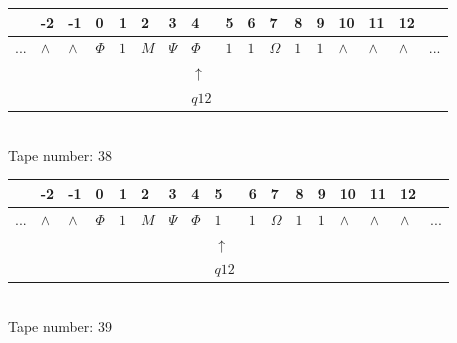 \documentclass[11pt]{article}
\begin{document}
\begin{table}[H]
\centering
\begin{tabular}{lllllllllllllllll}
 & -2 & -1 & 0 & 1 & 2 & 3 & 4 & 5 & 6 & 7 & 8 & 9 & 10 & 11 & 12 & \\
\hline
$...$ & \multicolumn{1}{|l|}{$\wedge$} & \multicolumn{1}{|l|}{$\wedge$} & \multicolumn{1}{|l|}{$\Phi$} & \multicolumn{1}{|l|}{$1$} & \multicolumn{1}{|l|}{$M$} & \multicolumn{1}{|l|}{$\Psi$} & \multicolumn{1}{|l|}{$\Phi$} & \multicolumn{1}{|l|}{$1$} & \multicolumn{1}{|l|}{$1$} & \multicolumn{1}{|l|}{$\Omega$} & \multicolumn{1}{|l|}{$1$} & \multicolumn{1}{|l|}{$1$} & \multicolumn{1}{|l|}{$\wedge$} & \multicolumn{1}{|l|}{$\wedge$} & \multicolumn{1}{|l|}{$\wedge$} & $...$\\
\hline
&  &  &  &  &  &  & $\uparrow$ &  &  &  &  &  &  &  &  &  \\
&  &  &  &  &  &  & $ q12 $ &  &  &  &  &  &  &  &  &  \\
\end{tabular}
\\
Tape number: 38
\noindent\makebox[\linewidth]{\hdashrule{\textwidth}{1pt}{1pt}}\end{table}

\begin{table}[H]
\centering
\begin{tabular}{lllllllllllllllll}
 & -2 & -1 & 0 & 1 & 2 & 3 & 4 & 5 & 6 & 7 & 8 & 9 & 10 & 11 & 12 & \\
\hline
$...$ & \multicolumn{1}{|l|}{$\wedge$} & \multicolumn{1}{|l|}{$\wedge$} & \multicolumn{1}{|l|}{$\Phi$} & \multicolumn{1}{|l|}{$1$} & \multicolumn{1}{|l|}{$M$} & \multicolumn{1}{|l|}{$\Psi$} & \multicolumn{1}{|l|}{$\Phi$} & \multicolumn{1}{|l|}{$1$} & \multicolumn{1}{|l|}{$1$} & \multicolumn{1}{|l|}{$\Omega$} & \multicolumn{1}{|l|}{$1$} & \multicolumn{1}{|l|}{$1$} & \multicolumn{1}{|l|}{$\wedge$} & \multicolumn{1}{|l|}{$\wedge$} & \multicolumn{1}{|l|}{$\wedge$} & $...$\\
\hline
&  &  &  &  &  &  &  & $\uparrow$ &  &  &  &  &  &  &  &  \\
&  &  &  &  &  &  &  & $ q12 $ &  &  &  &  &  &  &  &  \\
\end{tabular}
\\
Tape number: 39
\noindent\makebox[\linewidth]{\hdashrule{\textwidth}{1pt}{1pt}}\end{table}
\end{document}
